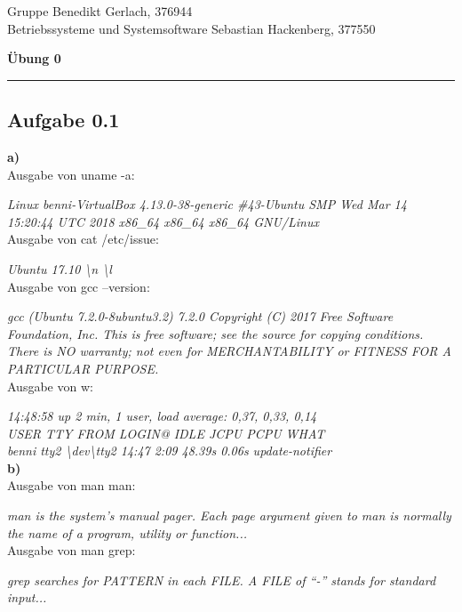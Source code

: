 \documentclass[a4paper,graphics,11pt]{article}
\newcommand{\aufgabe}[1]{\subsection*{Aufgabe #1}}
\begin{document}
\noindent Gruppe              \hfill Benedikt Gerlach, 376944\\
\noindent Betriebssysteme und Systemsoftware       \hfill Sebastian Hackenberg, 377550\\
\begin{center}
	\LARGE{\textbf{Übung 0}}
\end{center}
\begin{center}
\rule[0.1ex]{\textwidth}{1pt}
\end{center}

\aufgabe{0.1}
\textbf{a)}\\
Ausgabe von uname -a:

\textit{Linux benni-VirtualBox 4.13.0-38-generic \#43-Ubuntu SMP Wed Mar 14 15:20:44 UTC 2018 x86\_64 x86\_64 x86\_64 GNU/Linux}\\

Ausgabe von cat /etc/issue:

\textit{Ubuntu 17.10 \textbackslash n \textbackslash l}\\

Ausgabe von gcc --version:

\textit{gcc (Ubuntu 7.2.0-8ubuntu3.2) 7.2.0
Copyright (C) 2017 Free Software Foundation, Inc.
This is free software; see the source for copying conditions.  There is NO
warranty; not even for MERCHANTABILITY or FITNESS FOR A PARTICULAR PURPOSE.}\\

Ausgabe von w:

\textit{14:48:58 up 2 min,  1 user,  load average: 0,37, 0,33, 0,14\\
USER     TTY      FROM             LOGIN@   IDLE   JCPU   PCPU WHAT\\
benni    tty2     \textbackslash dev\textbackslash tty2        14:47    2:09  48.39s  0.06s update-notifier}\\

\textbf{b)}\\
Ausgabe von man man:
 
\textit{man is the system's manual pager.  Each page argument given to  man  is
normally  the  name of a program, utility or function...}\\

Ausgabe von man grep:

\textit{grep  searches  for  PATTERN  in  each  FILE.  A FILE of “-” stands for
standard input...}\\

\newpage
\end{document}
